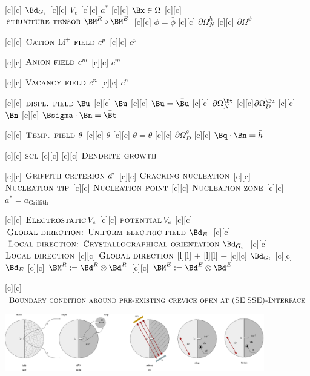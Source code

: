 [c][c] {$\Bd_{G_{i}}$}
[c][c] {$V_{e}$}
[c][c]   {\scriptsize $a^{\!\ast}$}
[c][c] {$\Bx \in \Omega$}
[c][c] {$\textsc{structure tensor } \BM^{R} \circ \BM^{E}$}
[c][c] {$\phi=\bar{\phi}$}
[c][c] {$\partial\Omega^{h}_{N}$}
[c][c] {$\partial\Omega^{\phi}$}

[c][c]  {\scriptsize $\textsc{Cation } \text{Li}^{+}
		\textsc{ field }  c^{p}$}
[c][c]  {$c^{p}$}

[c][c] {\scriptsize $\textsc{Anion field } c^{m}$}
[c][c]  {$c^{m}$}

[c][c]   {\scriptsize $\textsc{Vacancy field } c^{n}$}
[c][c]  {$c^{n}$}

[c][c] {\scriptsize $\textsc{displ. field } \Bu$}
[c][c]   {$\Bu$}
[c][c] {$\Bu=\bar{\Bu}$}
[c][c]  {$\partial\Omega^{\Bt}_{N}$}
[c][c]{$\partial\Omega^{\Bu}_{D}$}
[c][c]    {$\Bn$}
[c][c] {$\Bsigma\cdot\Bn = \bar{\Bt}$}

[c][c]  {\tiny $\textsc{Temp. field } \theta$}
[c][c]    {$\theta$}
[c][c] {$\theta = \bar{\theta}$}
[c][c]  {$\partial\Omega^{\theta}_{D}$}
[c][c]  {$\Bq\cdot\Bn = \bar{h}$}

[c][c] {\tiny $\textsc{scl}$}
[c][c]  {}
[c][c] {\tiny $\textsc{Dendrite growth}$}

[c][c] {\tiny $\textsc{Griffith criterion } a^{\!\ast}$}
[c][c] {\tiny $\textsc{Cracking nucleation}$}
[c][c] {\tiny $\textsc{Nucleation tip}$}
[c][c] {\tiny $\textsc{Nucleation point}$}
[c][c] {\tiny $\textsc{Nucleation zone}$}
[c][c] {\tiny $a^{\!\ast}\!\!=\!a_{\text{Griffith}}$}

[c][c] {\scriptsize $\textsc{Electrostatic}\, V_{e}$}
[c][c] {\scriptsize $\textsc{potential}\, V_{e}$}
[c][c] {\tiny $\textsc{Global direction: Uniform electric field } \Bd_{E}$}
[c][c] {\tiny $\textsc{Local direction:  Crystallographical orientation } \Bd_{G_{i}}$}
[c][c] {\tiny $\textsc{Local direction}$}
[c][c] {\tiny $\textsc{Global direction}$}
[l][l] {\tiny $+$}
[l][l] {\tiny $-$}
[c][c] {\tiny $\Bd_{G_{i}}$}
[c][c] {\tiny $\Bd_{E}$}
[c][c] {$\BM^{R} := \Bd^{R} \otimes \Bd^{R}$}
[c][c] {$\BM^{E} := \Bd^{E} \otimes \Bd^{E}$}

[c][c] {\scriptsize $\textsc{Boundary condition around pre-existing crevice open at (SE$|$SSE)-Interface}$}

\includegraphics[width=0.85\textwidth]{structuralfivefields_multi_edited.eps}